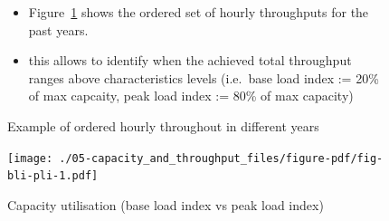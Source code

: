 \documentclass[
  a4paper,
  DIV=11,
  numbers=noendperiod]{scrreport}
\providecommand{\tightlist}{%
  \setlength{\itemsep}{0pt}\setlength{\parskip}{0pt}}\usepackage{longtable,booktabs,array}
\begin{document}
\begin{figure}

\begin{minipage}[t]{0.55\linewidth}

{\centering 


\caption{\label{fig-bli-pli-example}Example of ordered hourly throughout
in different years}

}

\end{minipage}%
%
\begin{minipage}[t]{0.45\linewidth}

{\centering 

\begin{itemize}
\tightlist
\item
  Figure~\ref{fig-bli-pli-example} shows the ordered set of hourly
  throughputs for the past years.
\item
  this allows to identify when the achieved total throughput ranges
  above characteristics levels (i.e.~base load index := 20\% of max
  capcaity, peak load index := 80\% of max capacity)
\end{itemize}

}

\end{minipage}%

\end{figure}

\begin{figure}[H]

{\centering \texttt{[image: ./05-capacity\_and\_throughput\_files/figure-pdf/fig-bli-pli-1.pdf]}

}

\caption{\label{fig-bli-pli}Capacity utilisation (base load index vs
peak load index)}

\end{figure}
\end{document}

